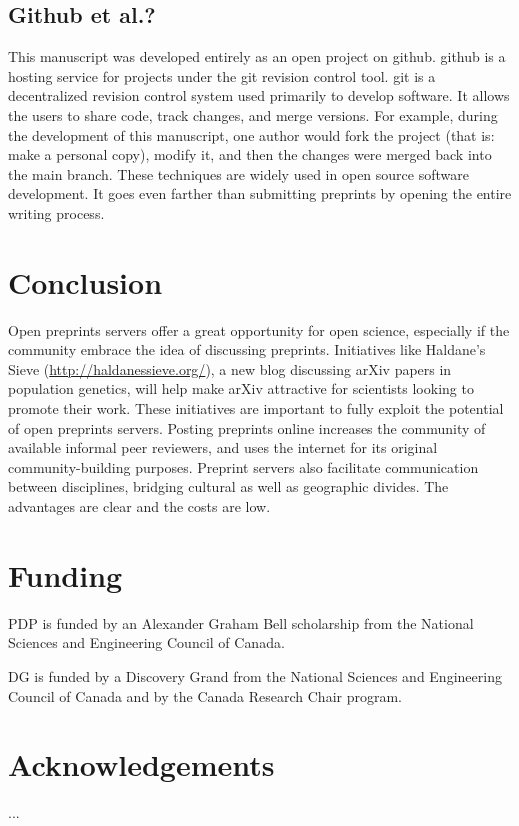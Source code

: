\documentclass[letterpaper,twocolumn,superscriptaddress,showkeys]{revtex4-1}
\begin{document}
\subsection{Github et al.?}

This manuscript was developed entirely as an open project on github. github is a
hosting service for projects under the git revision control tool. git is a
decentralized revision control system used primarily to develop software. It
allows the users to share code, track changes, and merge versions. For example,
during the development of this manuscript, one author would fork the project
(that is: make a personal copy), modify it, and then the changes were merged
back into the main branch. These techniques are widely used in open source
software development. It goes even farther than submitting preprints by opening
the entire writing process. 

\section{Conclusion}

Open preprints servers offer a great opportunity for open science, especially if
the community embrace the idea of discussing preprints. Initiatives like
Haldane's Sieve (\href{http://haldanessieve.org/}{http://haldanessieve.org/}), a
new blog discussing arXiv papers in population genetics, will help make arXiv
attractive for scientists looking to promote their work. These initiatives are
important to fully exploit the potential of open preprints servers. Posting
preprints online increases the community of available informal peer reviewers,
and uses the internet for its original community-building purposes.  Preprint
servers also facilitate communication between disciplines, bridging cultural as
well as geographic divides. The advantages are clear and the costs are low.

\section{Funding}

PDP is funded by an Alexander Graham Bell scholarship from the National Sciences
and Engineering Council of Canada.

DG is funded by a Discovery Grand from the National Sciences and Engineering
Council of Canada and by the Canada Research Chair program.

\section{Acknowledgements}

...

\newpage


\end{document}
